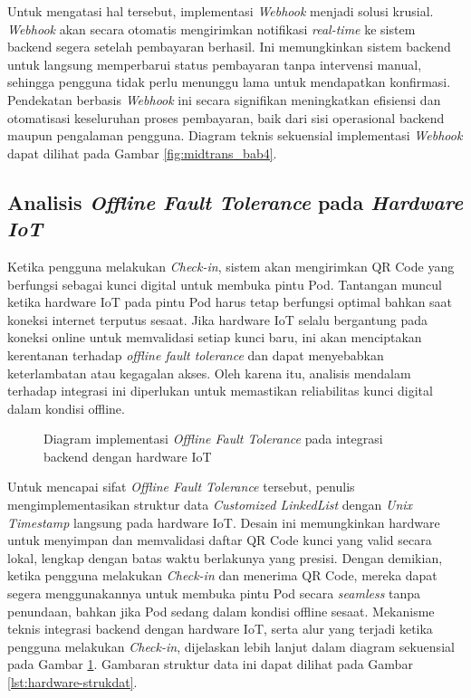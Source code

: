 Untuk mengatasi hal tersebut, implementasi \textit{Webhook} menjadi solusi krusial. \textit{Webhook} akan secara otomatis mengirimkan notifikasi \textit{real-time} ke sistem backend segera setelah pembayaran berhasil. Ini memungkinkan sistem backend untuk langsung memperbarui status pembayaran tanpa intervensi manual, sehingga pengguna tidak perlu menunggu lama untuk mendapatkan konfirmasi. Pendekatan berbasis \textit{Webhook} ini secara signifikan meningkatkan efisiensi dan otomatisasi keseluruhan proses pembayaran, baik dari sisi operasional backend maupun pengalaman pengguna. Diagram teknis sekuensial implementasi \textit{Webhook} dapat dilihat pada Gambar \ref{fig:midtrans_bab4}.

\subsection{Analisis \textit{Offline Fault Tolerance} pada \textit{Hardware IoT}}

Ketika pengguna melakukan \textit{Check-in}, sistem akan mengirimkan QR Code yang berfungsi sebagai kunci digital untuk membuka pintu Pod. Tantangan muncul ketika hardware IoT pada pintu Pod harus tetap berfungsi optimal bahkan saat koneksi internet terputus sesaat. Jika hardware IoT selalu bergantung pada koneksi online untuk memvalidasi setiap kunci baru, ini akan menciptakan kerentanan terhadap \textit{offline fault tolerance} dan dapat menyebabkan keterlambatan atau kegagalan akses. Oleh karena itu, analisis mendalam terhadap integrasi ini diperlukan untuk memastikan reliabilitas kunci digital dalam kondisi offline.

\begin{figure}[H]
    \centering
    \caption{Diagram implementasi \textit{Offline Fault Tolerance} pada integrasi backend dengan hardware IoT}
    \label{fig:oft_bab4}
\end{figure}

Untuk mencapai sifat \textit{Offline Fault Tolerance} tersebut, penulis mengimplementasikan struktur data \textit{Customized LinkedList} dengan \textit{Unix Timestamp} langsung pada hardware IoT. Desain ini memungkinkan hardware untuk menyimpan dan memvalidasi daftar QR Code kunci yang valid secara lokal, lengkap dengan batas waktu berlakunya yang presisi. Dengan demikian, ketika pengguna melakukan \textit{Check-in} dan menerima QR Code, mereka dapat segera menggunakannya untuk membuka pintu Pod secara \textit{seamless} tanpa penundaan, bahkan jika Pod sedang dalam kondisi offline sesaat. Mekanisme teknis integrasi backend dengan hardware IoT, serta alur yang terjadi ketika pengguna melakukan \textit{Check-in}, dijelaskan lebih lanjut dalam diagram sekuensial pada Gambar \ref{fig:oft_bab4}. Gambaran struktur data ini dapat dilihat pada Gambar \ref{lst:hardware-strukdat}.